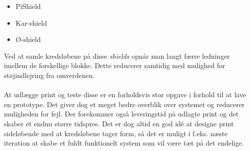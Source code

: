 \begin{itemize}
\item PiShield
\item Kar-shield
\item Ø-shield
\end{itemize}

Ved at samle kredsløbene på disse \emph{shields} opnår man langt færre ledninger imellem de forskellige blokke. Dette reducerer samtidig med mulighed for støjindlejring fra omverdenen.
\\\\
At udlægge print og teste disse er en forholdsvis stor opgave i forhold til at lave en prototype. Det giver dog et meget bedre overblik over systemet og reducerer muligheden for fejl. Der forekommer også leveringstid på udlagte print og det skaber et endnu større tidspres. Det er dog altid en god idé at designe print sideløbende med at kredsløbene tager form, så det er muligt i f.eks. næste iteration at skabe et fuldt funktionelt system som vil være tæt på det endelige.